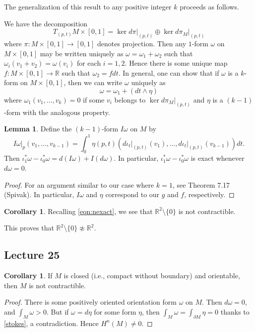 \documentclass[10pt,letterpaper,cm]{nupset}
\theoremstyle{definition}
\theoremstyle{theorem}
\newtheorem{lemma}[definition]{Lemma}
\newtheorem{corollary}[definition]{Corollary}
\theoremstyle{remark}
\newcommand{\R}{\mathbb R}
\newcommand{\1}{\mathbf{1}}
\newcommand{\0}{\vec 0}
\begin{document}
\medskip


The generalization of this result to any positive integer $k$ proceeds as follows.

\medskip


We have the decomposition $$T_{(p,t)}M \times \left[0,1\right] = \ker d\pi\bigr\rvert_{(p,t)} \oplus \ker d\pi_M\bigr\rvert_{(p,t)}$$ where $\pi: M \times \left[0,1\right]\to \left[0,1\right]$ denotes projection. Then any $1$-form $\omega$ on $M \times \left[0,1\right]$ may be written uniquely as $\omega = \omega_1 + \omega_2$ such that $\omega_i(v_1 + v_2) = \omega(v_i)$ for each $i=1, 2$. Hence there is some unique map $f : M \times \left[0,1\right] \to \R$ such that $\omega_2 = f dt$. In general, one can show that if $\omega$ is a $k$-form on $M \times \left[0,1\right]$, then we can write $\omega$ uniquely as $$\omega = \omega_1 + \left(dt \wedge \eta\right)$$ where $\omega_1(v_1, \ldots, v_k) =0$ if some $v_i$ belongs to $\ker d\pi_M\bigr\rvert_{(p,t)}$ and $\eta$ is a $\left(k-1\right)$-form with the analogous property.
\begin{lemma}\label{exact}
Define the $\left(k-1\right)$-form $I\omega$ on $M$ by $$I \omega \bigr\rvert_p(v_1, \ldots, v_{k-1}) = \int_0^1 \eta(p, t)\left(d\iota_t\bigr\rvert_{(p,t)}(v_1), \ldots, d\iota_t\bigr\rvert_{(p,t)}(v_{k-1})\right)dt   .$$ Then $\iota^{\ast}_1\omega  - \iota^{\ast}_0 \omega = d(I\omega) + I(d\omega)$. In particular, $\iota^{\ast}_1\omega  - \iota^{\ast}_0 \omega$ is exact whenever $d\omega =0$.
\end{lemma}
\begin{proof}
For an argument similar to our  case where $k=1$,  see Theorem 7.17 (Spivak). In particular, $I\omega$ and $\eta$ correspond to our $g$ and $f$, respectively.
\end{proof} %


\smallskip

\begin{corollary}
Recalling \eqref{eqn:nexact}, we see that $\R^2\setminus \{0\}$ is not contractible.
\end{corollary}

This proves that $\R^2\setminus \{0\} \not\approx \R^2$.

\subsection{Lecture 25}

\begin{corollary}
If $M$ is closed (i.e., compact without boundary) and orientable, then $M$ is not contractible.
\end{corollary}
\begin{proof}
There is some positively oriented orientation form $\omega$ on $M$. Then $d\omega =0$, and $\int_M \omega >0$. But if $\omega = d \eta$ for some form $\eta$, then $\int_M \omega =  \int_{\partial{M}} \eta =0$ thanks to \cref{stokes}, a contradiction. Hence $H^n(M) \ne 0$.
\end{proof}
\end{document}

